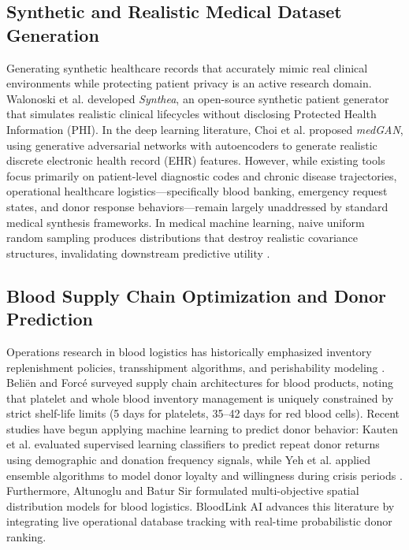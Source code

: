 \documentclass[conference]{IEEEtran}
\begin{document}
\subsection{Synthetic and Realistic Medical Dataset Generation}
Generating synthetic healthcare records that accurately mimic real clinical environments while protecting patient privacy is an active research domain. Walonoski et al. \cite{walonoski2018synthea} developed \textit{Synthea}, an open-source synthetic patient generator that simulates realistic clinical lifecycles without disclosing Protected Health Information (PHI). In the deep learning literature, Choi et al. \cite{choi2017medgan} proposed \textit{medGAN}, using generative adversarial networks with autoencoders to generate realistic discrete electronic health record (EHR) features. However, while existing tools focus primarily on patient-level diagnostic codes and chronic disease trajectories, operational healthcare logistics---specifically blood banking, emergency request states, and donor response behaviors---remain largely unaddressed by standard medical synthesis frameworks. In medical machine learning, naive uniform random sampling produces distributions that destroy realistic covariance structures, invalidating downstream predictive utility \cite{little2019missing}.

\subsection{Blood Supply Chain Optimization and Donor Prediction}
Operations research in blood logistics has historically emphasized inventory replenishment policies, transshipment algorithms, and perishability modeling \cite{belien2012supply, gunpinar2015stochastic, fariman2024robust}. Beli\"en and Forc{\'e} \cite{belien2012supply} surveyed supply chain architectures for blood products, noting that platelet and whole blood inventory management is uniquely constrained by strict shelf-life limits (5 days for platelets, 35--42 days for red blood cells). Recent studies have begun applying machine learning to predict donor behavior: Kauten et al. \cite{kauten2022predicting} evaluated supervised learning classifiers to predict repeat donor returns using demographic and donation frequency signals, while Yeh et al. \cite{yeh2024prediction} applied ensemble algorithms to model donor loyalty and willingness during crisis periods \cite{wu2022predicting}. Furthermore, Altunoglu and Batur Sir \cite{altunoglu2024multi} formulated multi-objective spatial distribution models for blood logistics. BloodLink AI advances this literature by integrating live operational database tracking with real-time probabilistic donor ranking.
\end{document}
